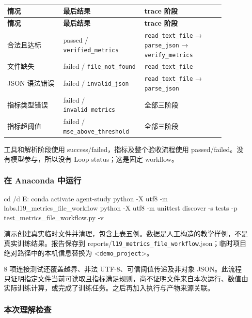 \documentclass[UTF8,zihao=-4,fontset=fandol]{ctexart}
\begin{document}
{\small\setlength{\tabcolsep}{4pt}
\renewcommand{\arraystretch}{1.25}
\begin{longtable}{>{\raggedright\arraybackslash}p{0.23\linewidth}>{\raggedright\arraybackslash}p{0.33\linewidth}>{\raggedright\arraybackslash}p{0.33\linewidth}}
\toprule
\textbf{情况} & \textbf{最后结果} & \textbf{trace 阶段} \\
\midrule\endfirsthead
\toprule
\textbf{情况} & \textbf{最后结果} & \textbf{trace 阶段} \\
\midrule\endhead
\bottomrule\endfoot
合法且达标 & passed / \nolinkurl{verified_metrics} & \nolinkurl{read_text_file} → \nolinkurl{parse_json} → \nolinkurl{verify_metrics} \\
文件缺失 & failed / \nolinkurl{file_not_found} & \nolinkurl{read_text_file} \\
JSON 语法错误 & failed / \nolinkurl{invalid_json} & \nolinkurl{read_text_file} → \nolinkurl{parse_json} \\
指标类型错误 & failed / \nolinkurl{invalid_metrics} & 全部三阶段 \\
指标超阈值 & failed / \nolinkurl{mse_above_threshold} & 全部三阶段 \\
\end{longtable}}

工具和解析阶段使用 success/failed，指标及整个验收流程使用 passed/failed。没有模型参与，所以没有 Loop status；这是固定 workflow。

\subsubsection{在 Anaconda 中运行}

\begin{Code}
cd /d E:\study\agent
conda activate agent-study
python -X utf8 -m labs.l19_metrics_file_workflow
python -X utf8 -m unittest discover -s tests -p test_metrics_file_workflow.py -v
\end{Code}

演示创建真实临时文件并清理，包含上表五例。数据是人工构造的教学样例，不是真实训练结果。报告保存到 reports/\nolinkurl{l19_metrics_file_workflow}.json；临时项目绝对路径中的本机信息替换为 <\nolinkurl{demo_project}>。

8 项连接测试还覆盖越界、非法 UTF-8、可信阈值传递及非对象 JSON。此流程只证明指定文件当前可读取且指标满足规则，尚不证明文件来自本次运行、数值由实际训练计算，或完成了训练任务。之后再加入执行与产物来源关联。

\subsubsection{本次理解检查}
\end{document}
